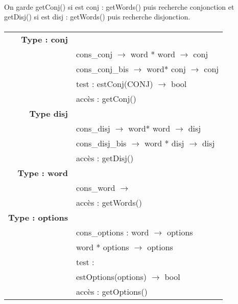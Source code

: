 \paragraph{}
On garde getConj() si est conj : getWords() puis recherche conjonction et
getDisj() si est disj : getWords() puis recherche disjonction.

\paragraph{}

\begin{tabular}{r l}
\textbf{Type : conj} & \\
& cons_conj $\rightarrow$ word * word $\rightarrow$ conj\\
& cons_conj_bis $\rightarrow$ word* conj $\rightarrow$ conj\\
	
&test : estConj(CONJ) $\rightarrow$ bool \\

&accès : getConj()\\

\textbf{Type disj}&\\
&cons_disj $\rightarrow$ word* word $\rightarrow$ disj\\
&cons_disj_bis $\rightarrow$ word * disj $\rightarrow$ disj\\

&accès : getDisj()\\

\textbf{Type : word}&\\ 
&cons_word $\rightarrow$\\ 
&accès : getWords()\\

\textbf{Type : options}&\\
&cons_options : word $\rightarrow$ options\\
&word * options $\rightarrow$ options\\
&test :\\
&estOptions(options) $\rightarrow$ bool\\

&accès : getOptions() \\
\end{tabular}

